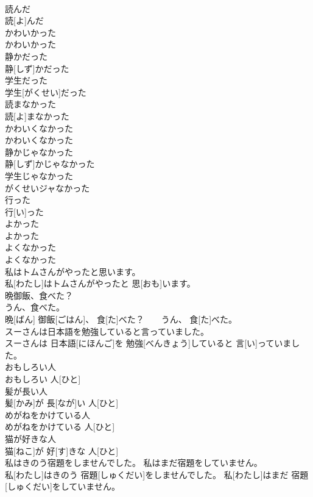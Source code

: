 \documentclass[8pt]{extreport}
\begin{document}
\begin{CJK}{UTF8}{min}
\\	読んだ	
\\	読[よ]んだ	
\\	かわいかった	
\\	かわいかった	
\\	静かだった	
\\	静[しず]かだった	
\\	学生だった	
\\	学生[がくせい]だった	
\\	読まなかった	
\\	読[よ]まなかった	
\\	かわいくなかった	
\\	かわいくなかった	
\\	静かじゃなかった	
\\	静[しず]かじゃなかった	
\\	学生じゃなかった	
\\	がくせいジャなかった	
\\	行った	
\\	行[い]った	
\\	よかった	
\\	よかった	
\\	よくなかった	
\\	よくなかった	
\\	私はトムさんがやったと思います。	
\\	私[わたし]はトムさんがやったと 思[おも]います。	
\\	晩御飯、食べた？　
\\	うん、食べた。	
\\	晩[ばん] 御飯[ごはん]、 食[た]べた？　　うん、 食[た]べた。	
\\	スーさんは日本語を勉強していると言っていました。	
\\	スーさんは 日本語[にほんご]を 勉強[べんきょう]していると 言[い]っていました。	
\\	おもしろい人	
\\	おもしろい 人[ひと]	
\\	髪が長い人	
\\	髪[かみ]が 長[なが]い 人[ひと]	
\\	めがねをかけている人	
\\	めがねをかけている 人[ひと]	
\\	猫が好きな人	
\\	猫[ねこ]が 好[す]きな 人[ひと]	
\\	私はきのう宿題をしませんでした。 私はまだ宿題をしていません。	
\\	私[わたし]はきのう 宿題[しゅくだい]をしませんでした。 私[わたし]はまだ 宿題[しゅくだい]をしていません。	

\end{CJK}
\end{document}
